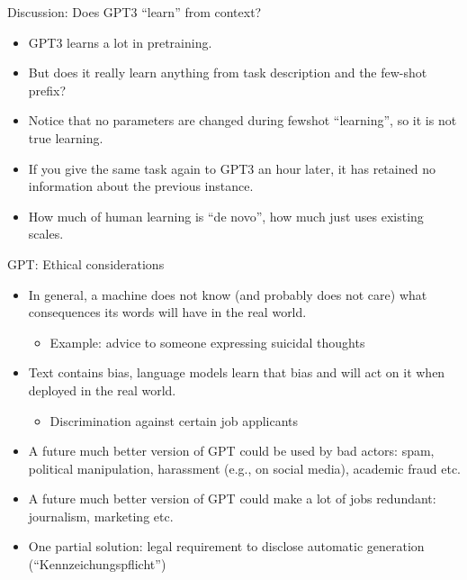 \begin{frame}{Discussion: Does GPT3 ``learn'' from context?}

\vfill

  \begin{itemize}
\item GPT3 learns a lot in pretraining.
    \item But does it really learn anything from
task description and    the few-shot prefix?
    \item Notice that no parameters are changed during
    fewshot ``learning'', so it is not true learning.
    \item If you give the same task again to GPT3 an
    hour later, it has retained no information about the
    previous instance.
    \item How much of human learning is ``de novo'',
    how much just uses existing scales.

    \end{itemize}

\vfill

\end{frame}


\begin{frame}{GPT: Ethical considerations}

\vfill

  \begin{itemize}
\item In general, a machine does not know (and
probably does not care) what consequences its words will have
in the real world.
  \begin{itemize}
\item Example: advice to someone expressing suicidal thoughts
    \end{itemize}
\item Text contains bias, language models learn that
bias and will act on it when deployed in the real world.
  \begin{itemize}
\item Discrimination against certain job applicants
    \end{itemize}
\item A future much better version of GPT could be
used by bad actors: spam, political manipulation, harassment
(e.g., on social media), academic fraud etc.
\item A future much better version of GPT could make a
lot of jobs redundant: journalism, marketing etc.
\item One partial solution: legal requirement to
disclose automatic generation (``Kennzeichungspflicht'')
    \end{itemize}

\vfill

\end{frame}

